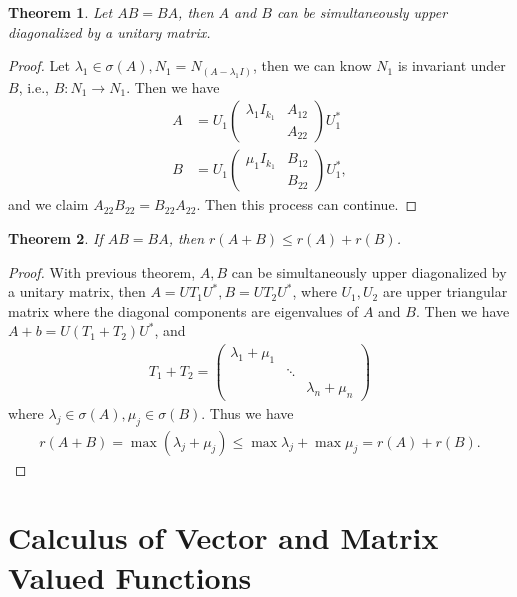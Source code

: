 \documentclass[10pt]{book}
\newtheorem{theorem}{Theorem}[chapter]
\theoremstyle{definition}
\numberwithin{equation}{chapter}
\begin{document}
\medskip

\begin{theorem}
Let $AB = BA$, then $A$ and $B$ can be simultaneously upper diagonalized by a unitary matrix.
\end{theorem}
\begin{proof}
Let $\lambda_1\in\sigma(A), N_1 = N_{(A - \lambda_1 I)}$, then we can know $N_1$ is invariant under $B$, i.e., $B:N_1\to N_1$. Then we have 
\begin{align*}
    A & = U_1 \begin{pmatrix}
    \lambda_1 I_{k_1} & A_{12} \\
     & A_{22}
    \end{pmatrix} U_1^* \\
    B & = U_1 \begin{pmatrix}
    \mu_1 I_{k_1} & B_{12} \\
     & B_{22}
    \end{pmatrix} U_1^*,
\end{align*}
and we claim $A_{22}B_{22} = B_{22}A_{22}$. Then this process can continue.
\end{proof}

\medskip

\begin{theorem}
If $AB = BA$, then $r(A+B)\leq r(A)+r(B)$.
\end{theorem}
\begin{proof}
With previous theorem, $A,B$ can be simultaneously upper diagonalized by a unitary matrix, then $A = UT_1U^*, B = UT_2U^*$, where $U_1, U_2$ are upper triangular matrix where the diagonal components are eigenvalues of $A$ and $B$. Then we have
$A+b = U(T_1+T_2)U^*$, and 
\begin{align*}
    T_1+T_2 = \begin{pmatrix}
    \lambda_1 + \mu_1 &  &  \\
     & \ddots &  \\
     &  & \lambda_n + \mu_n
    \end{pmatrix}
\end{align*}
where $\lambda_j\in\sigma(A), \mu_j\in\sigma(B)$. Thus we have
\begin{align*}
    r(A+B) = \max (\lambda_j + \mu_j) \leq \max \lambda_j + \max \mu_j = r(A)+r(B).
\end{align*}
\end{proof}

\medskip

\chapter{Calculus of Vector and Matrix Valued Functions}
\end{document}
